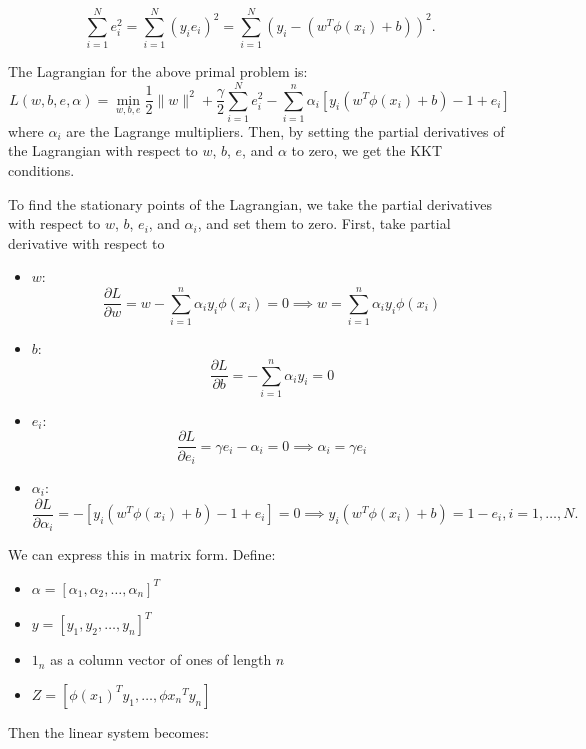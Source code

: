 $$\sum_{i=1}^N e_i^2 = \sum_{i=1}^N (y_ie_i)^2 = \sum_{i=1}^N (y_i-(w^T \phi(x_i) + b) )^2.$$


   The Lagrangian for the above primal problem is:
   \[
   L(w, b, e, \alpha) = \min_{w, b, e} \frac{1}{2} \|w\|^2 + \frac{\gamma}{2} \sum_{i=1}^N e_i^2 - \sum_{i=1}^n \alpha_i \left[ y_i (w^T \phi(x_i) + b) - 1 + e_i \right]
   \]
   where \( \alpha_i \) are the Lagrange multipliers. Then, by setting the partial derivatives of the Lagrangian with respect to \( w \), \( b \), \( e \), and \( \alpha \) to zero, we get the KKT conditions.

To find the stationary points of the Lagrangian, we take the partial derivatives with respect to \( w \), \( b \), \( e_i \), and \( \alpha_i \), and set them to zero. First, take partial derivative with respect to 

\begin{itemize}
	\item \( w \): \[
   \frac{\partial L}{\partial w} = w - \sum_{i=1}^n \alpha_i y_i \phi(x_i) = 0 \implies w = \sum_{i=1}^n \alpha_i y_i \phi(x_i)
   \]
	\item \( b \):
   \[
   \frac{\partial L}{\partial b} = -\sum_{i=1}^n \alpha_i y_i = 0
   \]
\item \( e_i \):
   \[
   \frac{\partial L}{\partial e_i} = \gamma e_i - \alpha_i = 0 \implies \alpha_i = \gamma e_i
   \]
\item \( \alpha_i \):
   \[
   \frac{\partial L}{\partial \alpha_i} = - \left[ y_i (w^T \phi(x_i) + b) - 1 + e_i \right] = 0 \implies y_i (w^T \phi(x_i) + b) = 1 - e_i, i=1,\dots, N.
   \]
\end{itemize}


We can express this in matrix form. Define:
\begin{itemize}
	\item \( \alpha = [\alpha_1, \alpha_2, \ldots, \alpha_n]^T \)
	\item \( y = [y_1, y_2, \ldots, y_n]^T \)
	\item \( 1_n \) as a column vector of ones of length \( n \)
	\item \( Z = [\phi(x_1)^Ty_1, \dots, \phi{x_n}^Ty_n] \)  
\end{itemize}


Then the linear system becomes:

